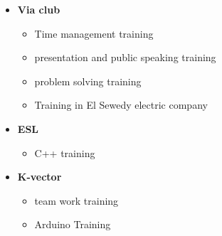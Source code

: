 \documentclass[10pt,a4paper,ragged2e]{altacv}
\begin{document}


\divider

\begin{itemize}
\item \textbf{Via club} 
\begin{itemize}
    \item Time management training \item presentation and public speaking training 
    \item problem solving training
    \item Training in El Sewedy electric company 
\end{itemize}
\item \textbf{ESL}
\begin{itemize}
    \item C++ training 
\end{itemize}
\item \textbf{K-vector}
\begin{itemize}
    \item team work training
    \item Arduino Training 
\end{itemize}
\end{itemize}

\divider






\clearpage

% 
% 
% 
% 
% 
% 
% 
\end{document}
